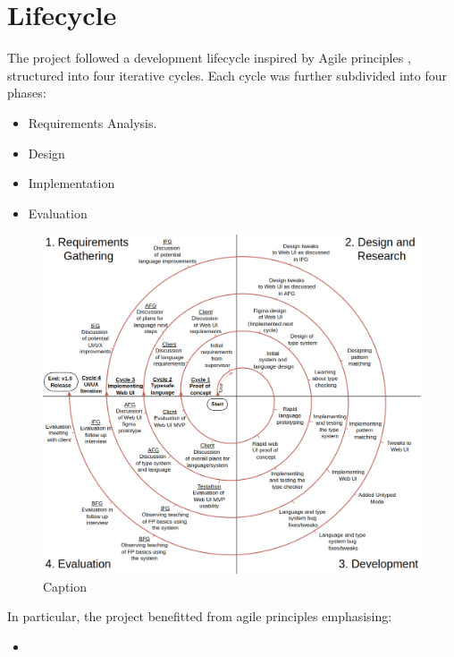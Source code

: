 \chapter{Lifecycle}
The project followed a development lifecycle inspired by Agile principles \cite{agilemanifesto2001}, structured into four iterative cycles. Each cycle was further subdivided into four phases:

\begin{itemize}
    \item Requirements Analysis. 
    \item Design
    \item Implementation 
    \item Evaluation
\end{itemize}

\begin{figure}[H]
    \centering
    \includegraphics[width=\linewidth]{images/spiral1.drawio.png}
    \caption{Caption}
    \label{fig:spiral}
\end{figure}

In particular, the project benefitted from agile principles emphasising:
\begin{itemize}
    \item 
\end{itemize}


